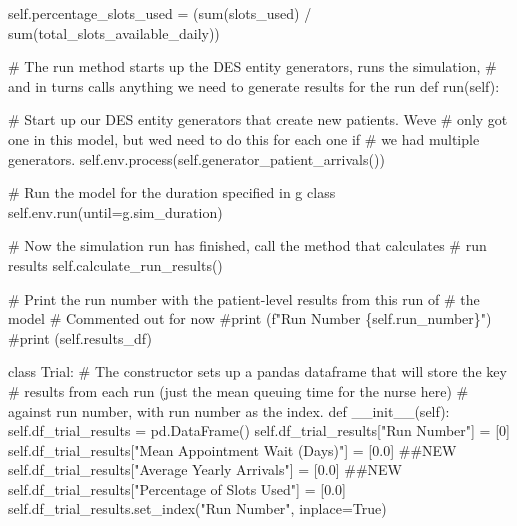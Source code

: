 \documentclass[
  letterpaper,
  DIV=11,
  numbers=noendperiod]{scrreprt}
\newenvironment{Shaded}{}{}
\newcommand{\BuiltInTok}[1]{\textcolor[rgb]{0.84,0.23,0.29}{#1}}
\newcommand{\CommentTok}[1]{\textcolor[rgb]{0.42,0.45,0.49}{#1}}
\newcommand{\DecValTok}[1]{\textcolor[rgb]{0.00,0.36,0.77}{#1}}
\newcommand{\FloatTok}[1]{\textcolor[rgb]{0.00,0.36,0.77}{#1}}
\newcommand{\FunctionTok}[1]{\textcolor[rgb]{0.44,0.26,0.76}{#1}}
\newcommand{\KeywordTok}[1]{\textcolor[rgb]{0.84,0.23,0.29}{#1}}
\newcommand{\NormalTok}[1]{\textcolor[rgb]{0.14,0.16,0.18}{#1}}
\newcommand{\OperatorTok}[1]{\textcolor[rgb]{0.14,0.16,0.18}{#1}}
\newcommand{\StringTok}[1]{\textcolor[rgb]{0.01,0.18,0.38}{#1}}
\newcommand{\VariableTok}[1]{\textcolor[rgb]{0.89,0.38,0.04}{#1}}
\begin{document}
\begin{Shaded}
\begin{Highlighting}[]
        \VariableTok{self}\NormalTok{.percentage\_slots\_used }\OperatorTok{=}\NormalTok{ (}\BuiltInTok{sum}\NormalTok{(slots\_used) }\OperatorTok{/} \BuiltInTok{sum}\NormalTok{(total\_slots\_available\_daily))}

    \CommentTok{\# The run method starts up the DES entity generators, runs the simulation,}
    \CommentTok{\# and in turns calls anything we need to generate results for the run}
    \KeywordTok{def}\NormalTok{ run(}\VariableTok{self}\NormalTok{):}

        \CommentTok{\# Start up our DES entity generators that create new patients.  We\textquotesingle{}ve}
        \CommentTok{\# only got one in this model, but we\textquotesingle{}d need to do this for each one if}
        \CommentTok{\# we had multiple generators.}
        \VariableTok{self}\NormalTok{.env.process(}\VariableTok{self}\NormalTok{.generator\_patient\_arrivals())}

        \CommentTok{\# Run the model for the duration specified in g class}
        \VariableTok{self}\NormalTok{.env.run(until}\OperatorTok{=}\NormalTok{g.sim\_duration)}

        \CommentTok{\# Now the simulation run has finished, call the method that calculates}
        \CommentTok{\# run results}
        \VariableTok{self}\NormalTok{.calculate\_run\_results()}

        \CommentTok{\# Print the run number with the patient{-}level results from this run of}
        \CommentTok{\# the model}
        \CommentTok{\# Commented out for now}
        \CommentTok{\#print (f"Run Number \{self.run\_number\}")}
        \CommentTok{\#print (self.results\_df)}

\KeywordTok{class}\NormalTok{ Trial:}
    \CommentTok{\# The constructor sets up a pandas dataframe that will store the key}
    \CommentTok{\# results from each run (just the mean queuing time for the nurse here)}
    \CommentTok{\# against run number, with run number as the index.}
    \KeywordTok{def}  \FunctionTok{\_\_init\_\_}\NormalTok{(}\VariableTok{self}\NormalTok{):}
        \VariableTok{self}\NormalTok{.df\_trial\_results }\OperatorTok{=}\NormalTok{ pd.DataFrame()}
        \VariableTok{self}\NormalTok{.df\_trial\_results[}\StringTok{"Run Number"}\NormalTok{] }\OperatorTok{=}\NormalTok{ [}\DecValTok{0}\NormalTok{]}
        \VariableTok{self}\NormalTok{.df\_trial\_results[}\StringTok{"Mean Appointment Wait (Days)"}\NormalTok{] }\OperatorTok{=}\NormalTok{ [}\FloatTok{0.0}\NormalTok{] }\CommentTok{\#\#NEW}
        \VariableTok{self}\NormalTok{.df\_trial\_results[}\StringTok{"Average Yearly Arrivals"}\NormalTok{] }\OperatorTok{=}\NormalTok{ [}\FloatTok{0.0}\NormalTok{] }\CommentTok{\#\#NEW}
        \VariableTok{self}\NormalTok{.df\_trial\_results[}\StringTok{"Percentage of Slots Used"}\NormalTok{] }\OperatorTok{=}\NormalTok{ [}\FloatTok{0.0}\NormalTok{]}
        \VariableTok{self}\NormalTok{.df\_trial\_results.set\_index(}\StringTok{"Run Number"}\NormalTok{, inplace}\OperatorTok{=}\VariableTok{True}\NormalTok{)}


\end{Highlighting}
\end{Shaded}
\end{document}
